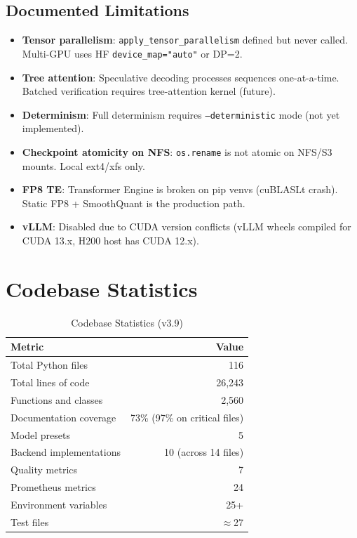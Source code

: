 \documentclass[11pt,a4paper,twoside]{article}
\begin{document}
\subsection{Documented Limitations}

\begin{itemize}[nosep]
  \item \textbf{Tensor parallelism}: \texttt{apply\_tensor\_parallelism} defined
    but never called. Multi-GPU uses HF \texttt{device\_map="auto"} or DP=2.
  \item \textbf{Tree attention}: Speculative decoding processes sequences
    one-at-a-time. Batched verification requires tree-attention kernel (future).
  \item \textbf{Determinism}: Full determinism requires \texttt{---deterministic}
    mode (not yet implemented).
  \item \textbf{Checkpoint atomicity on NFS}: \texttt{os.rename} is not atomic
    on NFS/S3 mounts. Local ext4/xfs only.
  \item \textbf{FP8 TE}: Transformer Engine is broken on pip venvs (cuBLASLt
    crash). Static FP8 + SmoothQuant is the production path.
  \item \textbf{vLLM}: Disabled due to CUDA version conflicts (vLLM wheels
    compiled for CUDA 13.x, H200 host has CUDA 12.x).
\end{itemize}

\section{Codebase Statistics}

\begin{table}[H]
\centering
\caption{Codebase Statistics (v3.9)}
\label{tab:stats}
\begin{tabular}{lr}
\toprule
\textbf{Metric} & \textbf{Value} \\
\midrule
Total Python files & 116 \\
Total lines of code & 26,243 \\
Functions and classes & 2,560 \\
Documentation coverage & 73\% (97\% on critical files) \\
Model presets & 5 \\
Backend implementations & 10 (across 14 files) \\
Quality metrics & 7 \\
Prometheus metrics & 24 \\
Environment variables & 25+ \\
Test files & $\approx$27 \\
\bottomrule
\end{tabular}
\end{table}
\end{document}
